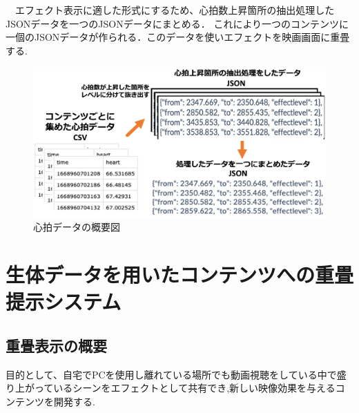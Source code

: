 　エフェクト表示に適した形式にするため、心拍数上昇箇所の抽出処理したJSONデータを一つのJSONデータにまとめる．
これにより一つのコンテンツに一個のJSONデータが作られる．このデータを使いエフェクトを映画画面に重畳する.

\begin{figure}[H]
    \centering
    \includegraphics[width=15cm]{images/chapter3/system.png}
    \caption{心拍データの概要図}
\end{figure}







\section{生体データを用いたコンテンツへの重畳提示システム}
\subsection{重畳表示の概要}
目的として、自宅でPCを使用し離れている場所でも動画視聴をしている中で盛り上がっているシーンをエフェクトとして共有でき,新しい映像効果を与えるコンテンツを開発する.



